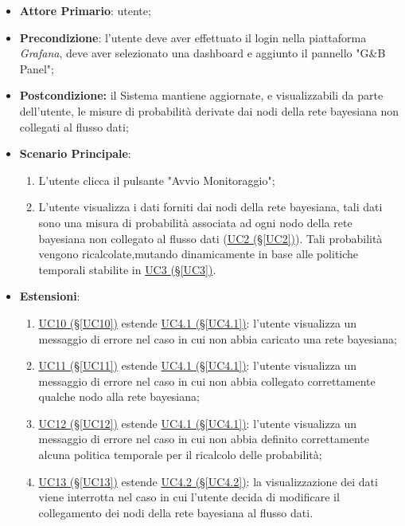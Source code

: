 \begin{itemize}
\item \textbf{Attore Primario}: utente;
\item \textbf{Precondizione}: l'utente deve aver effettuato il login nella piattaforma \textit{Grafana}, deve aver selezionato una dashboard e aggiunto il pannello "G\&B Panel";
\item \textbf{Postcondizione:} il Sistema mantiene aggiornate, e visualizzabili da parte dell'utente, le misure di probabilità derivate dai nodi della rete bayesiana non collegati al flusso dati;
\item \textbf{Scenario Principale}: 
	\begin{enumerate}
	\item L'utente clicca il pulsante "Avvio Monitoraggio";
	\item L'utente visualizza i dati forniti dai nodi della rete bayesiana, tali dati sono una misura di probabilità 			associata ad ogni nodo della rete bayesiana non collegato al flusso dati (\hyperref[UC2]{UC2 (§\ref*{UC2})}). 				Tali probabilità vengono ricalcolate,mutando dinamicamente in base alle politiche temporali stabilite in 						\hyperref[UC3]{UC3 (§\ref*{UC3})}.
	\end{enumerate}
\item \textbf{Estensioni}:
	\begin{enumerate}
	\item \hyperref[UC10]{UC10 (§\ref*{UC10})} estende \hyperref[UC4.1]{UC4.1 (§\ref*{UC4.1})}: l'utente visualizza un messaggio di errore nel caso in cui non abbia caricato una rete bayesiana;
	\item \hyperref[UC11]{UC11 (§\ref*{UC11})} estende \hyperref[UC4.1]{UC4.1 (§\ref*{UC4.1})}: l'utente visualizza un messaggio di errore nel caso in cui non abbia collegato correttamente qualche nodo alla rete bayesiana;
	\item \hyperref[UC12]{UC12 (§\ref*{UC12})} estende \hyperref[UC4.1]{UC4.1 (§\ref*{UC4.1})}: l'utente visualizza un messaggio di errore nel caso in cui non abbia definito correttamente alcuna politica temporale per il ricalcolo delle probabilità;
	\item \hyperref[UC13]{UC13 (§\ref*{UC13})} estende \hyperref[UC4.2]{UC4.2 (§\ref*{UC4.2})}: la visualizzazione dei dati viene interrotta nel caso in cui l'utente decida di modificare il collegamento dei nodi della rete bayesiana al flusso dati.
	\end{enumerate}
\end{itemize}

